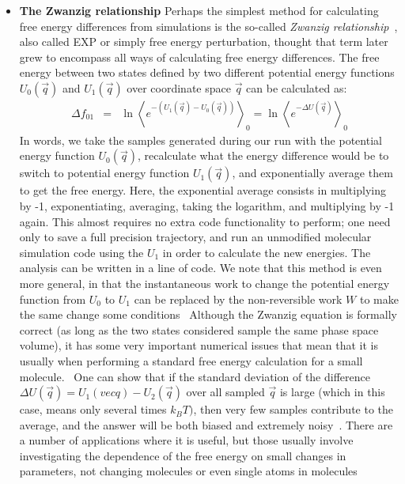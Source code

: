 \documentclass[9pt,bestpractices]{livecoms}
\newcommand{\expect}[1]{\left\langle{#1}\right\rangle}
\begin{document}
\begin{enumerate}
\begin{itemize}
    \item \textbf{The Zwanzig relationship} Perhaps the simplest method for calculating free energy
differences from simulations is the so-called \textit{Zwanzig
relationship}~\cite{orig.TPT}, also called EXP or simply free energy perturbation, thought that term later grew to encompass all ways of calculating free energy differences.
The free energy between two states defined by two different potential energy functions 
$U_0(\vec{q})$ and $U_1(\vec{q})$ over coordinate space $\vec{q}$ can be calculated as:
\begin{eqnarray}
\Delta f_{01} & = & \ln \expect{e^{-(U_1(\vec{q}) - U_0(\vec{q}))}}_0 =  \ln \expect{e^{-\Delta U(\vec{q})} }_0
\end{eqnarray}\label{eqn.zwanzig}
In words, we take the samples generated during our run with the potential energy function $U_0(\vec{q})$, recalculate what the energy difference would be to switch to potential energy function $U_1(\vec{q})$, and exponentially average them to get the free energy.  Here, the exponential average consists in multiplying by -1, exponentiating, averaging, taking the logarithm, and multiplying by -1 again.  This almost requires no extra code functionality to perform; one need only to save a full precision trajectory, and run an unmodified molecular simulation code using the $U_1$ in order to calculate the new energies.  The analysis can be written in a line of code.  We note that this method is even more general, in that the instantaneous work to change the potential energy function from $U_0$ to $U_1$ can be replaced by the non-reversible work $W$ to make the same change some conditions~\cite{xx} 
Although the Zwanzig equation is formally correct (as long as the two states considered sample the same phase space volume), it has some very important numerical issues that mean that it is usually when performing a standard free energy calculation for a small molecule.~\cite{shirts.comparison,LuND:Appmcf}  One can show that if the standard deviation of the difference $\Delta U(\vec{q}) = U_1(vec{q})-U_2(\vec{q})$ over all sampled $\vec{q}$ is large (which in this case, means only several times $k_BT)$, then very few samples contribute to the average, and the answer will be both biased and extremely noisy~\cite{xx}.  There are a number of applications where it is useful, but those usually involve investigating the dependence of the free energy on small changes in parameters, not changing molecules or even single atoms in molecules~\cite{xx}


\end{itemize}
\end{enumerate}
\end{document}
